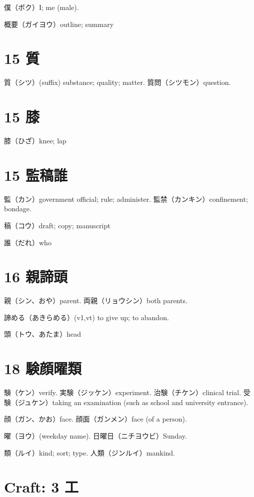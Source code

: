 僕（ボク）I; me (male).

概要（ガイヨウ）outline; summary

\section{15 質}

質（シツ）(suffix) substance; quality; matter.
質問（シツモン）question.

\section{15 膝}

膝（ひざ）knee; lap

\section{15 監稿誰}

監（カン）government official; rule; administer.
監禁（カンキン）confinement; bondage.

稿（コウ）draft; copy; manuscript

誰（だれ）who

\section{16 親諦頭}

親（シン、おや）parent.
両親（リョウシン）both parents.

諦める（あきらめる）(v1,vt)
to give up; to abandon.

頭（トウ、あたま）head

\section{18 験顔曜類}

験（ケン）verify.
実験（ジッケン）experiment.
治験（チケン）clinical trial.
受験（ジュケン）taking an examination (such as school and university entrance).

顔（ガン、かお）face.
顔面（ガンメン）face (of a person).

曜（ヨウ）(weekday name).
日曜日（ニチヨウビ）Sunday.

類（ルイ）kind; sort; type.
人類（ジンルイ）mankind.

\section{Craft: 3 工}

